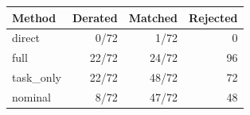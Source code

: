 \begin{center}\small
\begin{tabular}{lrrr}
\toprule
Method & Derated & Matched & Rejected \\
\midrule
direct & 0/72 & 1/72 & 0\\
full & 22/72 & 24/72 & 96\\
task\_only & 22/72 & 48/72 & 72\\
nominal & 8/72 & 47/72 & 48\\
\bottomrule
\end{tabular}
\end{center}
